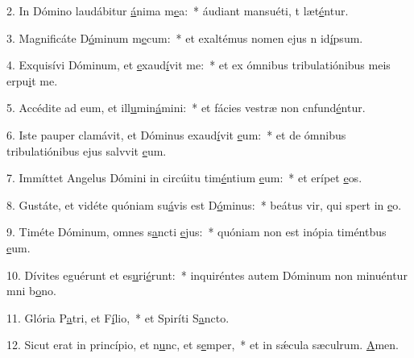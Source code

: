 2. In Dómino laudábitur \uline{á}nima m\uline{e}a:~* áudiant mansuéti, t læt\uline{é}ntur.\par 
3. Magnificáte D\uline{ó}minum m\uline{e}cum:~* et exaltémus nomen ejus n id\uline{í}psum.\par 
4. Exquisívi Dóminum, et \uline{e}xaud\uline{í}vit me:~* et ex ómnibus tribulatiónibus meis erpu\uline{i}t me.\par 
5. Accédite ad eum, et ill\uline{u}min\uline{á}mini:~* et fácies vestræ non cnfund\uline{é}ntur.\par 
6. Iste pauper clamávit, et Dóminus exaud\uline{í}vit \uline{e}um:~* et de ómnibus tribulatiónibus ejus salvvit \uline{e}um.\par 
7. Immíttet Angelus Dómini in circúitu tim\uline{é}ntium \uline{e}um:~* et erípet \uline{e}os.\par 
8. Gustáte, et vidéte quóniam su\uline{á}vis est D\uline{ó}minus:~* beátus vir, qui spert in \uline{e}o.\par 
9. Timéte Dóminum, omnes s\uline{a}ncti \uline{e}jus:~* quóniam non est inópia timéntbus \uline{e}um.\par 
10. Dívites eguérunt et es\uline{u}ri\uline{é}runt:~* inquiréntes autem Dóminum non minuéntur mni b\uline{o}no.\par 
11. Glória P\uline{a}tri, et F\uline{í}lio,~* et Spiríti S\uline{a}ncto.\par 
12. Sicut erat in princípio, et n\uline{u}nc, et s\uline{e}mper,~* et in sǽcula sæculrum. \uline{A}men.\par 

